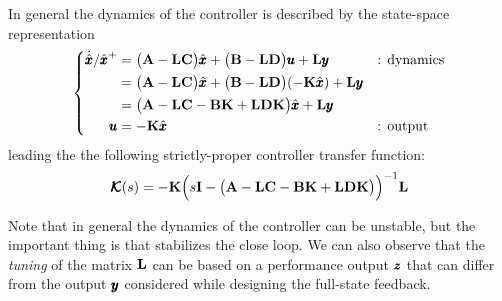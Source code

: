 	In general the dynamics of the controller is described by the state-space representation
	\begin{equation}
	\left\{ \begin{aligned}
		\dot{\hat {\pmb{x}}}/\hat {\pmb{x}}^+ & = \big(\mathbf{A}-\mathbf{L}\mathbf{C}\big)\hat {\pmb{x}} + \big(\mathbf{B} - \mathbf{L}\mathbf{D}\big) \pmb{u} + \mathbf{L} \pmb{y} && \textrm{: dynamics} \\
		& = \big(\mathbf{A}-\mathbf{L}\mathbf{C}\big)\hat {\pmb{x}} + \big(\mathbf{B} - \mathbf{L}\mathbf{D}\big)(-\mathbf{K}\hat {\pmb{x}}) + \mathbf{L} \pmb{y} \\ 
		& = \big(\mathbf{A}-\mathbf{L}\mathbf{C} - \mathbf{B}\mathbf{K} + \mathbf{L}\mathbf{D}\mathbf{K}\big)\hat {\pmb{x}} + \mathbf{L} \pmb{y} \\ 
		\pmb{u} & = - \mathbf{K} \hat {\pmb{x}} && \textrm{: output}
	\end{aligned} \right.
	\end{equation}
	leading the the following strictly-proper controller transfer function:
	\begin{equation}
		\pmb{\mathcal K}(s) = - \mathbf{K} \Big( s\mathbf{I} - \big(\mathbf{A} - \mathbf{L}\mathbf{C} - \mathbf{B}\mathbf{K} + \mathbf{L}\mathbf{D}\mathbf{K}\big) \Big)^{-1} \mathbf{L}
	\end{equation}

	Note that in general the dynamics of the controller can be unstable, but the important thing is that stabilizes the close loop. We can also observe that the \textit{tuning} of the matrix $\mathbf{L}$ can be based on a performance output $\pmb{z}$ that can differ from the output $\pmb{y}$ considered while designing the full-state feedback.
	
